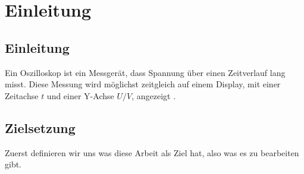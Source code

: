 \section{Einleitung}

\subsection{Einleitung}

Ein Oszilloskop ist ein Messgerät, dass Spannung über einen Zeitverlauf lang misst.
Diese Messung wird möglichst zeitgleich auf einem Display,
mit einer Zeitachse $t$ und einer Y-Achse $U/V$, angezeigt
\cite{knowUrOscilloscope}.


\subsection{Zielsetzung}

Zuerst definieren wir uns was diese Arbeit als Ziel hat, also was es zu bearbeiten gibt.


